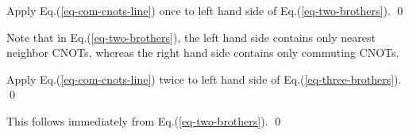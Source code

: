 \claim

\proof
Apply Eq.(\ref{eq-com-cnots-line}) once to
left hand side of Eq.(\ref{eq-two-brothers}).
\qed

Note that in Eq.(\ref{eq-two-brothers}),
the left hand side contains only nearest
neighbor CNOTs,
whereas
the right hand side
contains only commuting CNOTs.


\claim

\proof
Apply Eq.(\ref{eq-com-cnots-line}) twice to
left hand side of Eq.(\ref{eq-three-brothers}).
\qed

\claim

\proof
This follows immediately
from Eq.(\ref{eq-two-brothers}).
\qed

